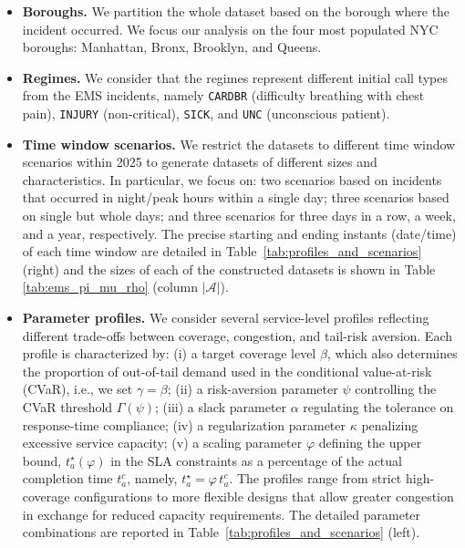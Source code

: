 \documentclass[letter,11pt, reqno]{amsart}
\def\A{\mathcal{A}}
\begin{document}
\begin{itemize}
    \item[-] \textbf{Boroughs.} We partition the whole dataset based on the borough where the incident occurred. We focus our analysis on the four most populated NYC boroughs: Manhattan, Bronx, Brooklyn, and Queens. 
    \item[-] \textbf{Regimes.} We consider that the regimes represent different initial call types from the EMS incidents, namely \texttt{CARDBR} (difficulty breathing with chest pain), \texttt{INJURY} (non-critical), \texttt{SICK}, and \texttt{UNC}	(unconscious patient).
    \item[-] \textbf{Time window scenarios.} We restrict the datasets to different time window scenarios within 2025 to generate datasets of different sizes and characteristics. In particular, we focus on: two scenarios based on incidents that occurred in night/peak hours within a single day; three scenarios based on single but whole days; and three scenarios for three days in a row, a week, and a year, respectively. The precise starting and ending instants (date/time) of each time window are detailed in Table~\ref{tab:profiles_and_scenarios} (right) and the sizes of each of the constructed datasets is shown in Table \ref{tab:ems_pi_mu_rho} (column $|\A|$).
    \item[-] \textbf{Parameter profiles.} We consider several service-level profiles reflecting different trade-offs 
between coverage, congestion, and tail-risk aversion. 
Each profile is characterized by: 
(i) a target coverage level $\beta$, which also determines the proportion of 
out-of-tail demand used in the conditional value-at-risk (CVaR), i.e., 
we set $\gamma = \beta$; 
(ii) a risk-aversion parameter $\psi$ controlling the CVaR threshold 
$\Gamma(\psi)$; 
(iii) a slack parameter $\alpha$ regulating the tolerance on response-time 
compliance; 
(iv) a regularization parameter $\kappa$ penalizing excessive service capacity; 
(v) a scaling parameter $\varphi$ defining the upper bound, 
$t_a^\star(\varphi)$ in the SLA constraints as a percentage of the 
actual completion time $t_a^c$, namely,
$t_a^\star = \varphi\, t_a^c$. 
The profiles range from strict high-coverage configurations to more flexible 
designs that allow greater congestion in exchange for reduced capacity 
requirements. The detailed parameter combinations are reported in 
Table~\ref{tab:profiles_and_scenarios} (left).


\end{itemize}
\end{document}
